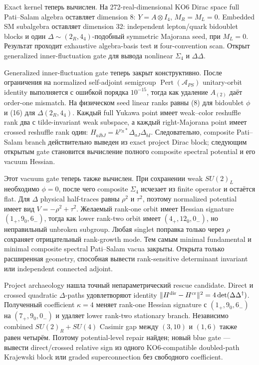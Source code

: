 Exact kernel теперь вычислен. На 272-real-dimensional KO6 Dirac space full
Pati--Salam algebra оставляет dimension 8:
\(Y=A\otimes I_4\), \(M_R=M_L=0\). Embedded SM subalgebra оставляет
dimension 32: independent lepton/quark bidoublet blocks и один
\(\Delta\sim(2_R,4_4)\)-подобный symmetric Majorana seed, при \(M_L=0\).
Результат проходит exhaustive algebra-basis test и four-convention scan.
Открыт generalized inner-fluctuation gate для вывода nonlinear
\(\Sigma_4\) и \(\Delta\Delta\).

Generalized inner-fluctuation gate теперь закрыт конструктивно. После
ограничения на normalized self-adjoint semigroup
\(\operatorname{Pert}(\mathcal A_{PS})\) unitary-orbit identity выполняется
с ошибкой порядка \(10^{-15}\), тогда как удаление \(A_{(2)}\) даёт
order-one mismatch. На физическом seed linear ranks равны (8) для
bidoublet \(\phi\) и (16) для \(\Delta(2_R,4_4)\). Каждый full Yukawa
point имеет weak--color reshuffle rank два с tilde-invariant weak subspace,
а каждый right-Majorana point имеет crossed reshuffle rank один:
\(H_{\dot aI\dot bJ}=k^{\nu_R*}\Delta_{\dot aJ}\Delta_{\dot bI}\).
Следовательно, composite Pati--Salam branch действительно выведен из exact
project Dirac block; следующим открытым gate становится вычисление полного
composite spectral potential и его vacuum Hessian.

Этот vacuum gate теперь также вычислен. При сохранении weak \(SU(2)_L\)
необходимо \(\phi=0\), после чего composite \(\Sigma_4\) исчезает из finite
operator и остаётся flat. Для \(\Delta\) physical half-traces равны
\(\rho^2\) и \(\tau^2\), поэтому normalized potential имеет вид
\(V=-\rho^2+\tau^2\). Желаемый rank-one orbit имеет Hessian signature
\((1_+,9_0,6_-)\), тогда как lower rank-two orbit имеет
\((4_+,12_0,0_-)\), но неправильный unbroken subgroup. Любая singlet
поправка только через \(\rho\) сохраняет отрицательный rank-growth mode.
Тем самым minimal fundamental и minimal composite spectral Pati--Salam
vacua закрыты. Открыта только расширенная geometry, способная вывести
rank-sensitive determinant invariant или independent connected adjoint.

Project archaeology нашла точный непараметрический rescue candidate.
Direct и crossed quadratic \(\Delta\)-paths удовлетворяют identity
\(\|H^{\rm dir}-H^{\rm cr}\|^2=4\det(\Delta\Delta^\dagger)\). Полученный
coefficient \(\kappa=4\) меняет rank-one Hessian signature с
\((1_+,9_0,6_-)\) на \((7_+,9_0,0_-)\) и удаляет lower rank-two stationary
branch. Независимо combined \(SU(2)_R+SU(4)\) Casimir gap между
\((3,10)\) и \((1,6)\) также равен четырём. Поэтому potential-level repair
найден; новый blue gate --- вывести direct/crossed relative sign из одного
KO6-compatible doubled-path Krajewski block или graded superconnection без
свободного coefficient.


